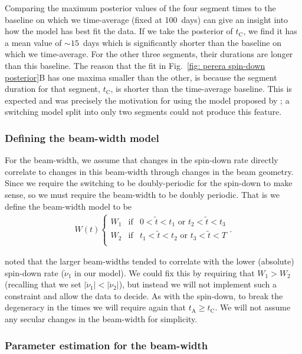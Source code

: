 \documentclass[../full_thesis/full_thesis.tex]{subfiles}
\newcommand{\nudotOne}{\dot{\nu}_{1}}
\newcommand{\nudotTwo}{\dot{\nu}_{2}}
\newcommand{\Wone}{W_{1}}
\newcommand{\Wtwo}{W_{2}}
\newcommand{\tI}[1]{t_{\mathrm{#1}}}
\begin{document}
Comparing the maximum posterior values of the four segment times to the
baseline on which we time-average (fixed at 100~days) can give an insight into how the
model has best fit the data. If we take the posterior of $\tI{C}$, we find it
has a mean value of $\sim 15$~days which is significantly shorter than the
baseline on which we time-average. For the other three segments, their durations are
longer than this baseline. The reason that the fit in Fig.~\ref{fig: perera
spin-down posterior}B has one maxima smaller than the other, is because the
segment duration for that segment, $\tI{C}$, is shorter than the time-average
baseline. This is expected and was precisely the motivation for using the model
proposed by \citet{Perera2015}; a switching model split into only two segments
could not produce this feature.

\subsubsection{Defining the beam-width model}

For the beam-width, we assume that changes in the spin-down rate directly
correlate to changes in this beam-width through changes in the beam geometry.
Since we require the switching to be doubly-periodic for the spin-down to make
sense, so we must require the beam-width to be doubly periodic. That is we
define the beam-width model to be
\begin{align}
W(t) \left\{
    \begin{array}{ccc}
    \Wone & \mathrm{if} & 0 < \tilde{t} < t_{1}
    \textrm{ or } t_{2} < \tilde{t} < t_{3}\\
    \Wtwo & \mathrm{if} & t_{1} < \tilde{t} < t_{2}
    \textrm{ or } t_{3} < \tilde{t} < T\\
    \end{array}
    \right..
\label{eqn: switching beam-width model}
\end{align}

\citet{Lyne2010} noted that the larger beam-widths tended to correlate with the
lower (absolute) spin-down rate ($\nudotOne$ in our model). We could fix this
by requiring that $\Wone > \Wtwo$ (recalling that we set $|\nudotOne| <
|\nudotTwo|$), but instead we will not implement such a constraint and allow
the data to decide.  As with the spin-down, to break the degeneracy in the
times we will require again that $\tI{A} \ge \tI{C}$. We will not assume any
secular changes in the beam-width for simplicity.

\subsubsection{Parameter estimation for the beam-width}
\end{document}
